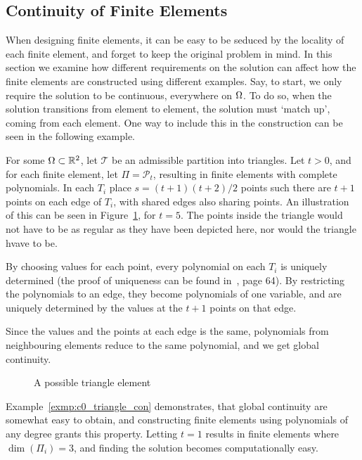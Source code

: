 \subsection{Continuity of Finite Elements}
When designing finite elements, it can be easy to be seduced by the 
locality of each finite element, and forget to keep the original 
problem in mind. In this section we examine how different requirements 
on the solution can affect how the finite elements are constructed 
using different examples.
Say, to start, we only require the solution to be continuous, 
everywhere on $\Omega$.
To do so, when the solution transitions from element to element, 
the solution must `match up', coming from each element. 
One way to include this in the construction can be seen in the 
following example.
\begin{exmp}{\quad\label{exmp:c0_triangle_con}}
For some $\Omega\subset \mathbb{R}^2$, let $\mathcal{T}$ be an admissible partition into 
triangles. 
Let $t >0$, and for each finite element, let $\Pi = \mathcal{P}_t$, resulting 
in finite elements with complete polynomials.
In each $T_i$ place
$s = (t+1)(t+2)/2$ points such 
there are $t+1$ points on each edge of $T_i$, with shared edges also 
sharing points.
An illustration of this can be seen in Figure~\ref{fig:triangle_nodal}, for 
$t=5$.
The points inside the triangle would not have to be as regular as they 
have been depicted here, nor would the triangle hvave to be.

By choosing values for each point, every polynomial on each $T_i$ 
is uniquely determined (the proof of uniqueness can be found in~\cite{Braess}, page 64).
By restricting the polynomials to an edge, they become polynomials of 
one variable, and are uniquely determined by the values at the $t+1$ points 
on that edge.

Since the values and the points at each edge is the same, polynomials from 
neighbouring elements reduce to the same polynomial, and we get global 
continuity.
\end{exmp}
\begin{figure}[ht]
    \centering
    
    \caption{A possible triangle element}\label{fig:triangle_nodal}
\end{figure}
Example~\ref{exmp:c0_triangle_con} demonstrates, that global continuity are 
somewhat easy to obtain, and constructing finite elements using polynomials 
of any degree grants this property. Letting $t=1$ results in finite elements 
where $\dim(\Pi_i)=3$, and finding the solution becomes computationally 
easy.

